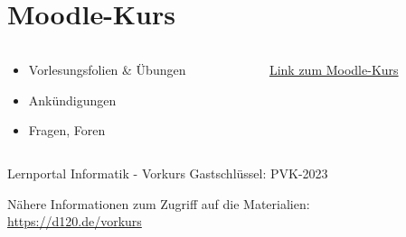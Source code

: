 \section{Moodle-Kurs}
\begin{frame}[c]
    \slidehead
    \begin{columns}[c]
        \begin{column}{.6\linewidth}
            \centering
            \begin{itemize}
                \item Vorlesungsfolien \& Übungen
                \item Ankündigungen
                \item Fragen, Foren
            \end{itemize}
        \end{column}%
        \begin{column}{.4\linewidth}
            \begin{figure}
                \centering\mbox{}
                \qrcode[height=2.5cm]{\moodlecourselink}
                \caption{\href{\moodlecourselink}{Link zum Moodle-Kurs}}
            \end{figure}
        \end{column}
    \end{columns}
    \vspace{-1em}
    \begin{block}{Lernportal Informatik - Vorkurs}
        {\Huge Gastschlüssel: PVK-2023}

        \vspace{1em}Nähere Informationen zum Zugriff auf die Materialien:\\
        \href{https://d120.de/vorkurs}{https://d120.de/vorkurs}
    \end{block}
\end{frame}


